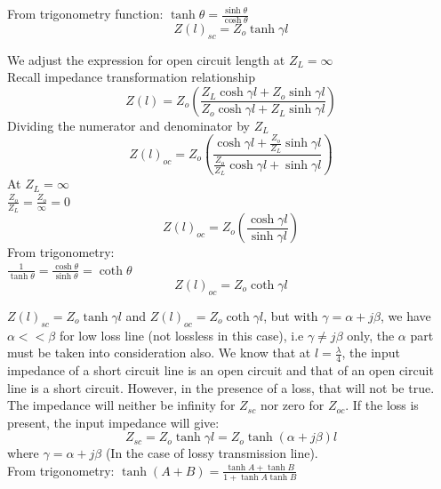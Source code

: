 From trigonometry function:
$ \tanh\theta =\frac{\sinh\theta}{\cosh\theta} $
\begin{equation}
\boxed{Z(l)_{sc}=Z_{o}\tanh\gamma l}	\end{equation}

We adjust the expression for open circuit length at $ Z_{L} =\infty $ \\
Recall impedance transformation relationship
\begin{equation}
Z(l) = Z_{o}\left(\frac{Z_{L}\cosh\gamma l + Z_{o}\sinh\gamma l}{Z_{o}\cosh\gamma l + Z_{L}\sinh\gamma l}\right)
\end{equation}
Dividing the numerator and denominator by $ Z_{L} $
\begin{equation}
Z(l)_{oc} = Z_{o}\left(\frac{\cosh\gamma l +\frac{Z_{o}}{Z_{L}}\sinh\gamma l}{\frac{Z_{o}}{Z_{L}}\cosh\gamma l+ \sinh\gamma l}\right)
\end{equation}
At $ Z_{L}=\infty $ \\
$ \frac{Z_{o}}{Z_{L}} =\frac{Z_{o}}{\infty} = 0 $ 
\begin{equation}
Z(l)_{oc} = Z_{o}\left(\frac{\cosh\gamma l}{\sinh\gamma l}\right)
\end{equation} 
From trigonometry:\\
$ \frac{1}{\tanh\theta}=\frac{\cosh\theta}{\sinh\theta}=\coth\theta $
\begin{equation}
\boxed{Z(l)_{oc}=Z_{o}\coth\gamma l}	
\end{equation}

$ Z(l)_{sc}=Z_{o}\tanh\gamma l $ and $ Z(l)_{oc}=Z_{o}\coth\gamma l $, but with $ \gamma=\alpha +j\beta $, we have $ \alpha<<\beta $ for low loss line (not lossless in this case), i.e $ \gamma\neq j\beta $ only, the $ \alpha $ part must be taken into consideration also. We know that at $ l=\frac{\lambda}{4} $, the input impedance of a short circuit line is an open circuit and that of an open circuit line is a short circuit. However, in the presence of a loss, that will not be true. The impedance will neither be infinity for $ Z_{sc} $ nor zero for $ Z_{oc} $. If the loss is present, the input impedance will give:\\
\begin{equation}
Z_{sc}=Z_{o}\tanh\gamma l=Z_{o}\tanh(\alpha+j\beta)l
\end{equation}
where $ \gamma=\alpha+j\beta $ (In the case of lossy transmission line).\\

From trigonometry:
$\tanh(A+B)=\frac{\tanh A+\tanh B}{1+\tanh A\tanh B} $

